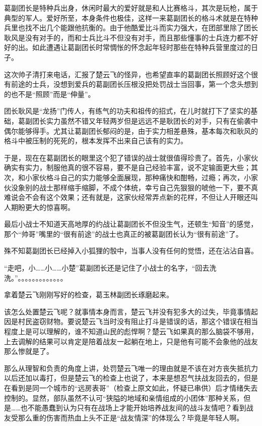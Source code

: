 葛副团长是特种兵出身，休闲时最大的爱好就是和人比赛格斗，其次是玩枪，属于典型的军人。爱好所至，本身条件也极佳，这样一来葛副团长的格斗术就是在特种兵里也找不出几个能跟他抗衡的。由于他酷爱比斗而实力强大，在团部里除了团长耿风是没有对手的，而和士兵比斗不但没有对手，而且那些懂事的士兵连力都不好好的出。如此遭遇让葛副团长时常惆怅的怀念起年轻时那些在特种兵营里度过的日子。

这次帅子清打来电话，汇报了楚云飞的怪异，也希望直率的葛副团长照顾好这个很有前途的士兵，没想到爱兵的葛副团长压根没把处罚战士当回事，第一个念头想到的也不是“照顾”而是“伸量”。

团长耿风是“龙扬”门传人，有练气的功夫和祖传的招式，在儿时就打下了坚实的基础，葛副团长实力虽然不错又年轻两岁但是远远不是耿团长的对手，只有在偷袭中偶尔能够得手。尤其让葛副团长郁闷的是，由于实力相差悬殊，基本每次和耿风的格斗中被压制的死死的，根本发挥不出来自己该有的实力。

于是，现在在葛副团长的眼里这个犯了错误的战士就很值得珍贵了。首先，小家伙确实有实力，制服他真的很不容易，要不是自己经验丰富，说不定输面更大些；其次，和小家伙格斗自己的实力能够全面展现，那种痛快和酣畅，过瘾；再次，小家伙没象别的战士那样缩手缩脚，不成个体统，幸亏自己先狠狠的唬他一下，要不真难说会不会有这个效果；还有就是，这家伙经常弄点新的花样，不但让人开眼还叫人期盼更大的惊喜啊。

最后小战士不知道天高地厚的约战让葛副团长不但没生气，还顿生“知音”的感觉，那个“帅哥”嘴里的“很有前途”的战士也真正的被葛副团长认为“很有前途”了。

殊不知葛副团长已经掉入小狐狸的彀中，当事人没有任何的觉悟，还在沾沾自喜。

“走吧，小……小……小楚”葛副团长还是记住了小战士的名字，“回去洗洗。”。。。。。。。。。。。。。

拿着楚云飞刚刚写好的检查，葛玉林副团长琢磨起来。

该怎么处置楚云飞呢？就事情本身而言，楚云飞并没有犯多大的过失，毕竟事情起因是村民盗窃财物。要说楚云飞当时没有阻止打斗是错误的话，那这个错误在相当程度上是可以理解的，谁不知道山民的彪悍啊？楚云飞如果真的那么脑袋不够用，上去调解的结果可以肯定是陪着战友一起躺在地上，只是他有可能不会象他的战友那么惨就是了。

那么从理智和负责的角度上讲，处罚楚云飞唯一的理由就是不该在对方丧失抵抗力以后还加以毒打，但是楚云飞的检查上也说了，本来是想忍气扶战友回去的，但是在看到是同一个城市的“远房表哥”（检查上原文如此，怀疑已串供）后才情绪失去控制的。显然，部队虽然不认可“狭隘的地域和亲情组成的小团体”那种关系，但是……也不能愚蠢到认为只有在战场上才能开始培养战友间的战斗友情吧？看到战友受那么重的伤害而热血上头不正是“战友情深”的体现么？毕竟是年轻人啊。

